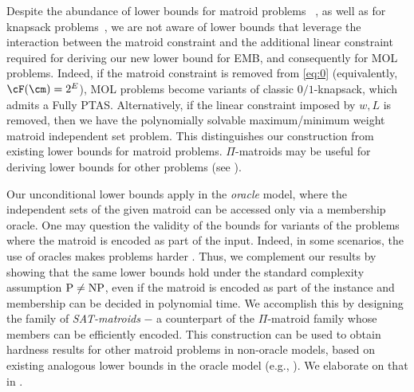 	
		Despite the abundance of lower bounds for matroid problems~%
		\cite{lovasz1978matroid,JK82,karp1985complexity,soto2014simple}, as well as for knapsack  problems~\cite{chekuri2005polynomial,kulik2010there,cygan2019problems,bringmann2021fine}, we are not aware of lower bounds that leverage the interaction between the matroid constraint and the additional linear constraint required for deriving our new lower bound for EMB, and consequently for MOL problems. Indeed, if the matroid constraint is removed from \eqref{eq:0} (equivalently, $\cF(\cm)=2^E$), MOL problems become variants of classic 
	$0/1${\sc-knapsack}, which admits a Fully PTAS. Alternatively, if the linear constraint imposed by $w,L$ is removed, then we have the polynomially solvable maximum/minimum weight matroid independent set problem. This distinguishes our construction from existing lower bounds for matroid problems. %
	 $\Pi$-matroids may be useful for deriving lower bounds for other problems %
	(see ).  
	

	
	
	
		 Our unconditional lower bounds apply in the {\em oracle} model, where the independent sets of the given matroid can be accessed only via a membership oracle. One may question the validity of the bounds for variants of the problems where the matroid is encoded as part of the input. Indeed, in some scenarios, the use of oracles makes problems harder \cite{canetti2004random,chang1994random}. Thus, we complement our results by showing that the same lower bounds hold under the standard complexity assumption $\textnormal{P}\neq\textnormal{NP}$, even if the matroid is encoded as part of the instance and membership can be decided in polynomial time. We accomplish this by designing the family of {\em \textnormal{SAT}-matroids} $-$ a counterpart of the $\Pi$-matroid family whose members can be efficiently encoded. This construction can be used to obtain hardness results for other matroid problems in non-oracle models, based on existing analogous lower bounds in the oracle model (e.g., \cite{JK82}). We elaborate on that in .
	
	

